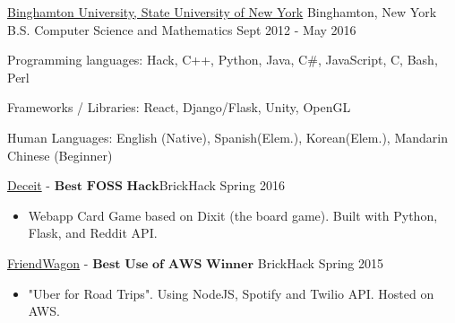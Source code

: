 \documentclass[11pt]{article}
\begin{document}
\spacedhrule{0.2em}{0.2em}  %

\headedsection
{\href{http://www.binghamton.edu/index.php}{Binghamton University, State University of New York}}
{Binghamton, New York} {
    \headedsubsection
    {B.S. Computer Science and Mathematics}
    {Sept 2012 - May 2016}
    {}
}
\spacedhrule{0.2em}{0.2em}  %

\inlineskillsection  %
{Programming languages:}
{ Hack, C++, Python, Java, C\#, JavaScript, C, Bash, Perl }

\inlineskillsection  
{Frameworks / Libraries:}
{ React, Django/Flask, Unity, OpenGL}

\inlineskillsection
{Human Languages:}
{English (Native), Spanish(Elem.), Korean(Elem.), Mandarin Chinese (Beginner)}


\spacedhrule{0.2em}{0.2em}  %

\projects
{{\href{https://github.com/gabeochoa/sokim}{Deceit}} - $\textbf{Best FOSS Hack}$}{BrickHack Spring 2016}
{
    \begin{itemize}[label={}]
        \setlength\itemsep{.005ex}
        \item{Webapp Card Game based on Dixit (the board game). Built with Python, Flask, and Reddit API.}
    \end{itemize}
}

\headedsubsection
{{\href{https://github.com/alanplotko/RoadTrip}{FriendWagon}} - $\textbf{Best Use of AWS Winner}$ }
{BrickHack Spring 2015}
{
    \begin{itemize}[label={}]
    	\setlength\itemsep{.005ex}
        \item{"Uber for Road Trips". Using NodeJS, Spotify and Twilio API. Hosted on AWS.}
    \end{itemize}
}
\end{document}
